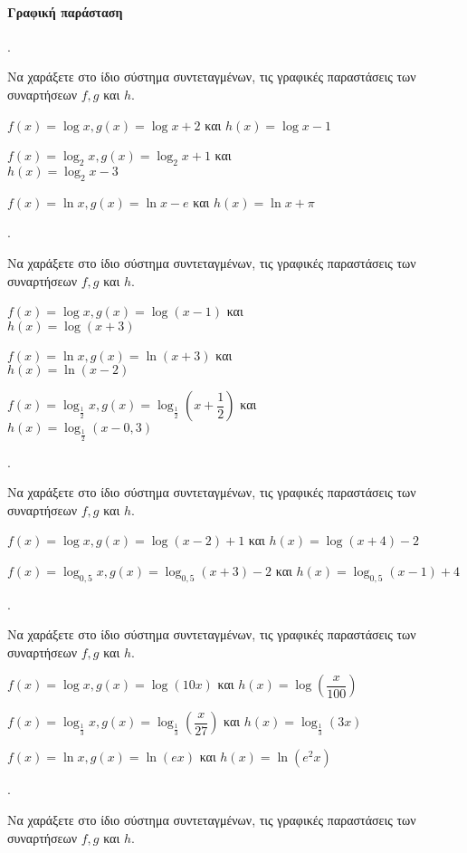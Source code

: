 \documentclass[11pt,a4paper,twocolumn]{article}
\newcounter{askhsh}
\newcommand{\askhsh}{{\large\theaskhsh.}\ \addtocounter{askhsh}{1}}
\begin{document}
\paragraph{Γραφική παράσταση}
\askhsh Να χαράξετε στο ίδιο σύστημα συντεταγμένων, τις γραφικές παραστάσεις των συναρτήσεων $f,g$ και $h$.
\begin{alist}[leftmargin=4mm]
\item $f(x)=\log{x},g(x)=\log{x}+2$ και $h(x)=\log{x}-1$
\item $f(x)=\log_2{x},g(x)=\log_2{x}+1$ και\\ $h(x)=\log_2{x}-3$
\item $f(x)=\ln{x},g(x)=\ln{x}-e$ και $h(x)=\ln{x}+\pi$
\end{alist}
\askhsh Να χαράξετε στο ίδιο σύστημα συντεταγμένων, τις γραφικές παραστάσεις των συναρτήσεων $f,g$ και $h$.
\begin{alist}
\item $f(x)=\log{x},g(x)=\log{(x-1)}$ και \\$h(x)=\log{(x+3)}$
\item $f(x)=\ln{x},g(x)=\ln{(x+3)}$ και \\$h(x)=\ln{(x-2)}$
\item $f(x)=\log_{\frac{1}{2}}{x},g(x)=\log_{\frac{1}{2}}{\left(x+\dfrac{1}{2}\right)}$ και \\$h(x)=\log_{\frac{1}{2}}{(x-0{,}3)}$
\end{alist}
\askhsh Να χαράξετε στο ίδιο σύστημα συντεταγμένων, τις γραφικές παραστάσεις των συναρτήσεων $f,g$ και $h$.
\begin{alist}
\item $f(x)=\log{x},g(x)=\log{(x-2)+1}$ και $h(x)=\log{(x+4)-2}$
\item $f(x)=\log_{0{,}5}{x},g(x)=\log_{0{,}5}{(x+3)}-2$ και $h(x)=\log_{0{,}5}{(x-1)+4}$
\end{alist}
\askhsh Να χαράξετε στο ίδιο σύστημα συντεταγμένων, τις γραφικές παραστάσεις των συναρτήσεων $f,g$ και $h$.
\begin{alist}
\item $f(x)=\log{x},g(x)=\log{(10x)}$ και $h(x)=\log{\left(\dfrac{x}{100}\right)}$
\item $f(x)=\log_{\frac{1}{3}}{x},g(x)=\log_{\frac{1}{3}}{\left(\dfrac{x}{27}\right)}$ και $h(x)=\log_{\frac{1}{3}}{(3x)}$
\item $f(x)=\ln{x},g(x)=\ln{(ex)}$ και $h(x)=\ln{(e^2x)}$
\end{alist}
\askhsh Να χαράξετε στο ίδιο σύστημα συντεταγμένων, τις γραφικές παραστάσεις των συναρτήσεων $f,g$ και $h$.
\end{document}
